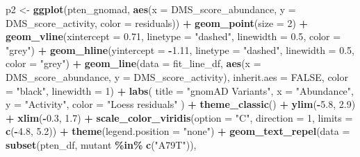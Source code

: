 \documentclass[
]{article}
\newenvironment{Shaded}{\begin{snugshade}}{\end{snugshade}}
\newcommand{\AttributeTok}[1]{\textcolor[rgb]{0.13,0.29,0.53}{#1}}
\newcommand{\ConstantTok}[1]{\textcolor[rgb]{0.56,0.35,0.01}{#1}}
\newcommand{\DecValTok}[1]{\textcolor[rgb]{0.00,0.00,0.81}{#1}}
\newcommand{\FloatTok}[1]{\textcolor[rgb]{0.00,0.00,0.81}{#1}}
\newcommand{\FunctionTok}[1]{\textcolor[rgb]{0.13,0.29,0.53}{\textbf{#1}}}
\newcommand{\NormalTok}[1]{#1}
\newcommand{\OtherTok}[1]{\textcolor[rgb]{0.56,0.35,0.01}{#1}}
\newcommand{\SpecialCharTok}[1]{\textcolor[rgb]{0.81,0.36,0.00}{\textbf{#1}}}
\newcommand{\StringTok}[1]{\textcolor[rgb]{0.31,0.60,0.02}{#1}}
\begin{document}
\begin{Shaded}
\begin{Highlighting}[]
\NormalTok{p2 }\OtherTok{\textless{}{-}} \FunctionTok{ggplot}\NormalTok{(pten\_gnomad, }\FunctionTok{aes}\NormalTok{(}\AttributeTok{x =}\NormalTok{ DMS\_score\_abundance, }\AttributeTok{y =}\NormalTok{ DMS\_score\_activity, }\AttributeTok{color =}\NormalTok{ residuals)) }\SpecialCharTok{+}
  \FunctionTok{geom\_point}\NormalTok{(}\AttributeTok{size =} \DecValTok{2}\NormalTok{) }\SpecialCharTok{+}
  \FunctionTok{geom\_vline}\NormalTok{(}\AttributeTok{xintercept =} \FloatTok{0.71}\NormalTok{, }\AttributeTok{linetype =} \StringTok{"dashed"}\NormalTok{, }\AttributeTok{linewidth =} \FloatTok{0.5}\NormalTok{, }\AttributeTok{color =} \StringTok{"grey"}\NormalTok{) }\SpecialCharTok{+}
  \FunctionTok{geom\_hline}\NormalTok{(}\AttributeTok{yintercept =} \SpecialCharTok{{-}}\FloatTok{1.11}\NormalTok{, }\AttributeTok{linetype =} \StringTok{"dashed"}\NormalTok{, }\AttributeTok{linewidth =} \FloatTok{0.5}\NormalTok{, }\AttributeTok{color =} \StringTok{"grey"}\NormalTok{) }\SpecialCharTok{+}
  \FunctionTok{geom\_line}\NormalTok{(}\AttributeTok{data =}\NormalTok{ fit\_line\_df, }\FunctionTok{aes}\NormalTok{(}\AttributeTok{x =}\NormalTok{ DMS\_score\_abundance, }\AttributeTok{y =}\NormalTok{ DMS\_score\_activity),}
            \AttributeTok{inherit.aes =} \ConstantTok{FALSE}\NormalTok{, }\AttributeTok{color =} \StringTok{"black"}\NormalTok{, }\AttributeTok{linewidth =} \DecValTok{1}\NormalTok{) }\SpecialCharTok{+}
  \FunctionTok{labs}\NormalTok{(}
    \AttributeTok{title =} \StringTok{"gnomAD Variants"}\NormalTok{,}
    \AttributeTok{x =} \StringTok{"Abundance"}\NormalTok{,}
    \AttributeTok{y =} \StringTok{"Activity"}\NormalTok{,}
    \AttributeTok{color =} \StringTok{"Loess residuals"}
\NormalTok{  ) }\SpecialCharTok{+}
  \FunctionTok{theme\_classic}\NormalTok{() }\SpecialCharTok{+}
  \FunctionTok{ylim}\NormalTok{(}\SpecialCharTok{{-}}\FloatTok{5.8}\NormalTok{, }\FloatTok{2.9}\NormalTok{) }\SpecialCharTok{+} \FunctionTok{xlim}\NormalTok{(}\SpecialCharTok{{-}}\FloatTok{0.3}\NormalTok{, }\FloatTok{1.7}\NormalTok{) }\SpecialCharTok{+}
  \FunctionTok{scale\_color\_viridis}\NormalTok{(}\AttributeTok{option =} \StringTok{"C"}\NormalTok{, }\AttributeTok{direction =} \DecValTok{1}\NormalTok{, }\AttributeTok{limits =} \FunctionTok{c}\NormalTok{(}\SpecialCharTok{{-}}\FloatTok{4.8}\NormalTok{, }\FloatTok{5.2}\NormalTok{)) }\SpecialCharTok{+}
  \FunctionTok{theme}\NormalTok{(}\AttributeTok{legend.position =} \StringTok{"none"}\NormalTok{) }\SpecialCharTok{+}
    \FunctionTok{geom\_text\_repel}\NormalTok{(}\AttributeTok{data =} \FunctionTok{subset}\NormalTok{(pten\_df, mutant }\SpecialCharTok{\%in\%} \FunctionTok{c}\NormalTok{(}\StringTok{"A79T"}\NormalTok{)),}

\end{Highlighting}
\end{Shaded}
\end{document}

